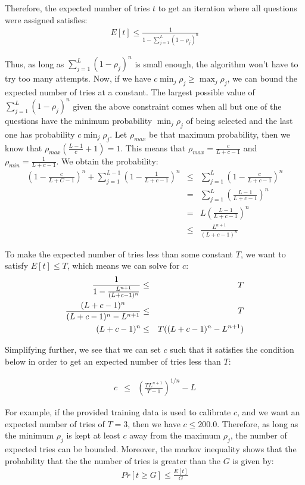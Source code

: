 \documentclass[psamsfonts]{amsart}
\begin{document}
Therefore, the expected number of tries $t$ to get an iteration where all questions were assigned satisfies:
\begin{eqnarray}
E[t] \leq \frac{1}{1 - \sum_{j=1}^L (1 - \rho_j)^n}
\end{eqnarray}

Thus, as long as $\sum_{j=1}^L (1 - \rho_j)^n$ is small enough, the algorithm won't have to try too many attempts. Now, if we have $c \min_j \rho_j \geq \max_j \rho_j$, we can bound the expected number of tries at a constant. The largest possible value of $\sum_{j=1}^L (1- \rho_j)^n$ given the above constraint comes when all but one of the questions have the minimum probability $\min_j \rho_j$ of being selected and the last one has probability $c \min_j \rho_j$. Let $\rho_{max}$ be that maximum probability, then we know that $\rho_{max}\left( \frac{L-1}{c} + 1 \right) = 1$. This means that $\rho_{max} = \frac{c}{L + c - 1}$ and $\rho_{min} = \frac{1}{L + c - 1}$. We obtain the probability:
\begin{eqnarray}
\left(1- \frac{c}{L+C-1} \right)^n + \sum_{j=1}^{L-1} \left(1 - \frac{1}{L+c-1} \right)^n &\leq& \sum_{j=1}^L \left( 1 - \frac{c}{L + c-1} \right)^n \\
&=& \sum_{j=1}^L \left( \frac{L-1}{L+c-1} \right)^n \\
&=& L \left( \frac{L-1}{L+c-1} \right)^n \\
&\leq& \frac{L^{n+1}}{(L+c-1)^n}
\end{eqnarray}

To make the expected number of tries less than some constant $T$, we want to satisfy $E[t] \leq T$, which means we can solve for $c$:
\begin{eqnarray}
{{1} \over {1 - \frac{L^{n+1}}{(L+c-1)^n}}} &\leq& T \\
{{(L+c-1)^n} \over {(L+c-1)^n - L^{n+1}}} &\leq& T \\
(L+c-1)^n &\leq& T ((L+c-1)^n - L^{n+1}) 
\end{eqnarray}

Simplifying further, we see that we can set $c$ such that it satisfies the condition below in order to get an expected number of tries less than $T$:

\begin{eqnarray}
c &\leq& \left( \frac{T L^{n+1}}{T-1} \right)^{1/n} - L 
\end{eqnarray}

For example, if the provided training data is used to calibrate $c$, and we want an expected number of tries of $T = 3$, then we have $c \leq 200.0$. Therefore, as long as the minimum $\rho_j$ is kept at least $c$ away from the maximum $\rho_j$, the number of expected tries can be bounded. Moreover, the markov inequality shows that the probability that the the number of tries is greater than the $G$ is given by:
\begin{eqnarray}
Pr[t \geq G] \leq \frac{E[t]}{G}
\end{eqnarray}
\end{document}
